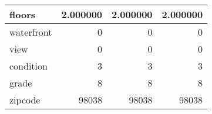 \begin{table}[H]
\begin{tabular}{|l|r|r|r|}
\hline floors & \cellcolor[rgb]{0.9, 0.54, 0.52} 2.000000 & \cellcolor[rgb]{0.9, 0.54, 0.52} 2.000000 & \cellcolor[rgb]{0.9, 0.54, 0.52} 2.000000 \\
\hline waterfront & \cellcolor[rgb]{0.9, 0.54, 0.52} 0 & \cellcolor[rgb]{0.9, 0.54, 0.52} 0 & \cellcolor[rgb]{0.9, 0.54, 0.52} 0 \\
\hline view & \cellcolor[rgb]{0.9, 0.54, 0.52} 0 & \cellcolor[rgb]{0.9, 0.54, 0.52} 0 & \cellcolor[rgb]{0.9, 0.54, 0.52} 0 \\
\hline condition & \cellcolor[rgb]{0.9, 0.54, 0.52} 3 & \cellcolor[rgb]{0.9, 0.54, 0.52} 3 & \cellcolor[rgb]{0.9, 0.54, 0.52} 3 \\
\hline grade & \cellcolor[rgb]{0.9, 0.54, 0.52} 8 & \cellcolor[rgb]{0.9, 0.54, 0.52} 8 & \cellcolor[rgb]{0.9, 0.54, 0.52} 8 \\
\hline zipcode & \cellcolor[rgb]{0.9, 0.54, 0.52} 98038 & \cellcolor[rgb]{0.9, 0.54, 0.52} 98038 & \cellcolor[rgb]{0.9, 0.54, 0.52} 98038 \\
\hline
\end{tabular}
\end{table}
